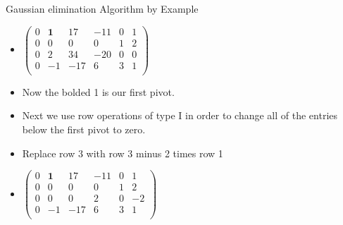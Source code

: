\documentclass{beamer}
\begin{document}

\begin{frame}{Gaussian elimination Algorithm by Example}

\begin{itemize}
\item $
\begin{pmatrix}
0 & \textbf{1} &  17    & -11   &  0  &  1  \\
0 &         0  &   0    &   0    &  1  &  2 \\
0 &         2  &  34    &  -20  &  0  &  0 \\
0 &        -1  &  -17   &  6    &  3  &  1 \\
\end{pmatrix}
$
\item Now the bolded 1 is our first pivot.
\item Next we use row operations of type I in order to change all of the
entries below the first pivot to zero.
\item Replace row 3 with row 3 minus 2 times row 1
\item $
\begin{pmatrix}
0 & \textbf{1} &  17   & -11  &  0  &  1  \\
0 &         0  &   0   &  0   &  1  &  2 \\
0 &         0  &   0   &  2   &  0  &  -2 \\
0 &        -1  &  -17   &  6   &  3  &  1 \\
\end{pmatrix}
$
\end{itemize}
\end{frame}

\end{document}
